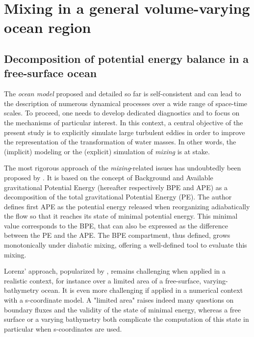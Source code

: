 \color{blue}
\section{Mixing in a general volume-varying ocean region}
\subsection{Decomposition of potential energy balance in a free-surface ocean}
\label{section_PE_chap2}

The \textit{ocean model} proposed and detailed so far is self-consistent and can lead to the description of numerous dynamical processes over a wide range of space-time scales. To proceed, one needs to develop dedicated diagnostics and to focus on the mechanisms of particular interest. In this context, a central objective of the present study is to explicitly simulate large turbulent eddies in order to improve the representation of the transformation of water masses. In other words, the (implicit) modeling or the (explicit) simulation of \textit{mixing} is at stake.

The most rigorous approach of the \textit{mixing}-related issues has undoubtedly been proposed by \cite{lorenz_available_1955}. It is based on the concept of Background and Available gravitational Potential Energy (hereafter respectively BPE and APE) as a decomposition of the total gravitational Potential Energy (PE). The author defines first APE as the potential energy released when reorganizing adiabatically the flow so that it reaches its state of minimal potential energy. This minimal value corresponds to the BPE, that can also be expressed as the difference between the PE and the APE. The BPE compartment, thus defined, grows monotonically under diabatic mixing, offering a well-defined tool to evaluate this mixing.

Lorenz' approach, popularized by \cite{winters_available_1995}, remains challenging when applied in a realistic context, for instance over a limited area of a free-surface, varying-bathymetry ocean. It is even more challenging if applied in a numerical context with a s-coordinate model. A "limited area" raises indeed many questions on boundary fluxes and the validity of the state of minimal energy, whereas a free surface or a varying bathymetry both complicate the computation of this state in particular when s-coordinates are used.

